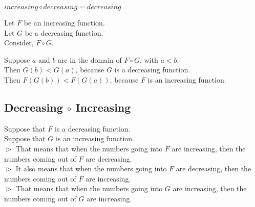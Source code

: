 \documentclass{ximera}
\begin{document}
\begin{fact}
$increasing \circ decreasing = decreasing$


Let $F$ be an increasing function. \\
Let $G$ be a decreasing function. \\


Consider, $F \circ G$.

Suppose $a$ and $b$ are in the domain of $F \circ G$, with $a < b$. \\

Then $G(b) < G(a)$, because $G$ is a decreasing function. \\

Then $F(G(b)) < F(G(a))$, because $F$ is an increasing function.


\end{fact}





































\subsection*{Decreasing $\circ$ Increasing}


Suppose that $F$ is a decreasing function. \\
Suppose that $G$ is an increasing function. \\


$\vartriangleright$ That means that when the numbers going into $F$ are increasing, then the numbers coming out of $F$ are decreasing. \\

$\vartriangleright$ It also means that when the numbers going into $F$ are decreasing, then the numbers coming out of $F$ are increasing. \\



$\vartriangleright$ That means that when the numbers going into $G$ are increasing, then the numbers coming out of $G$ are increasing. \\
\end{document}
